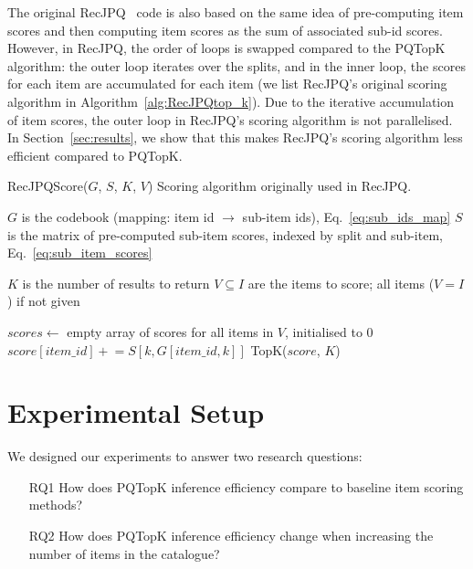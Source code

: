 \documentclass[sigconf,natbib=true, review=False]{acmart} %
\newcommand{\pluseq}{\mathrel{+}=}
\newcommand{\scrc}[1]{\textcolor[HTML]{000000}{#1}}
\begin{document}
 The original RecJPQ~\cite{petrovRecJPQTrainingLargeCatalogue2024} code is also based on the same idea of pre-computing item scores and then computing item scores as the sum of associated sub-id scores. However, in RecJPQ, the order of loops is swapped compared to the PQTopK algorithm: the outer loop iterates over the splits, and in the inner loop, the scores for each item are accumulated \scrc{for each item} (\scrc{we list RecJPQ's original scoring algorithm in  Algorithm~\ref{alg:RecJPQtop_k}}). Due to the \scrc{iterative accumulation of item scores}, the outer loop in RecJPQ's scoring algorithm is not parallelised. \scrc{In Section~\ref{sec:results}, we show} that this makes RecJPQ's scoring algorithm less efficient compared to PQTopK. 

\begin{algorithm}[h]
\small
\caption{RecJPQScore($G$, $S$, $K$, $V$) Scoring algorithm \scrc{originally} used in RecJPQ.}\label{alg:RecJPQtop_k}
\begin{algorithmic}[1]
   \Require $G$ is the codebook (mapping: item id $\rightarrow$ sub-item ids), Eq.~\eqref{eq:sub_ids_map}
   \Require $S$ is the matrix of pre-computed sub-item scores, indexed by split and sub-item, Eq.~\eqref{eq:sub_item_scores}

    

   \Require $K$ is the number of results to return
   \Require $V \subseteq I$ are the items to score; all items ($V = I$)  if not given 
   
   \State $scores \gets$ empty array of scores for all items in $V$, initialised to 0
    
            \State $score[item\_id]  \pluseq S[k,G[item\_id,k]] $ 
        \EndFor
   \EndFor
   \State \Return TopK($score$, $K$) 
\end{algorithmic}
\end{algorithm}

\FloatBarrier
\vspace{-0.5\baselineskip}
\section{Experimental Setup}\label{sec:expsetup}
We designed our experiments to answer two research questions: 
\begin{itemize}
    \item[RQ1] How does PQTopK inference efficiency compare to baseline item scoring methods? 
    \item[RQ2] How does PQTopK inference efficiency change when increasing the number of items in the catalogue? 
\end{itemize}
\end{document}
